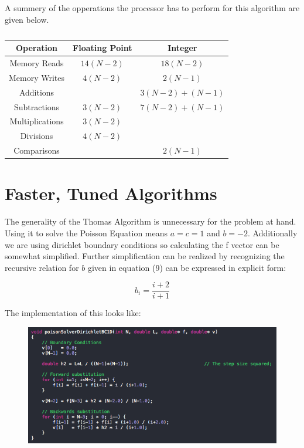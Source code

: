 \documentclass{article}
\begin{document}
A summery of the opperations the processor has to perform for this algorithm are given below.

\begin{table}[H]
	\centering
	\begin{tabular}{ c | c | c }
		Operation	    & Floating Point & Integer          \\
		\hline
		Memory Reads    &    $14(N-2)$   & $18(N-2)$        \\
		\hline
		Memory Writes   &     $4(N-2)$   & $2(N-1)$         \\
		\hline
		Additions       &                & $3(N-2) + (N-1)$ \\
		\hline
		Subtractions    &     $3(N-2)$   & $7(N-2) + (N-1)$ \\
		\hline
		Multiplications &     $3(N-2)$   &                  \\
		\hline
		Divisions       &     $4(N-2)$   &		           \\
		\hline
		Comparisons	    &                & $2(N-1)$         \\
	\end{tabular}
	\caption{ \label{table:}}
\end{table}

\section{Faster, Tuned Algorithms}
The generality of the Thomas Algorithm is unnecessary for the problem at hand.  Using it to solve the Poisson Equation means $a=c=1$ and $b=-2$.  Additionally we are using dirichlet boundary conditions so calculating the f vector can be somewhat simplified.  Further simplification can be realized by recognizing the recursive relation for $b$ given in equation (9) can be expressed in explicit form:

\begin{equation}
b_i = \frac{i+2}{i+1}
\end{equation}

The implementation of this looks like:

\begin{figure}[H]
	\centering
	\includegraphics[width=0.8\linewidth]{cppPoissonSolverFast.png}
	\caption{}
\end{figure}
\end{document}
